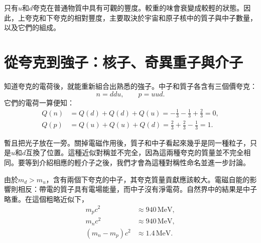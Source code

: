 \begin{classroomqa}
\end{classroomqa}

只有\(u\)和\(d\)夸克在普通物質中具有可觀的豐度。較重的味會衰變成較輕的狀態。因此，上夸克和下夸克的相對豐度，主要取決於宇宙和原子核中的質子與中子數量，以及它們的組成。

\begin{classroomqa}
\end{classroomqa}

\section{從夸克到強子：核子、奇異重子與介子}

知道夸克的電荷後，就能重新組合出熟悉的強子。中子和質子各含有三個價夸克：
\begin{equation}
n=ddu,
\qquad
p=uud.
\end{equation}
它們的電荷一算便知：
\begin{align}
Q(n) &= Q(d)+Q(d)+Q(u)
= -\frac13-\frac13+\frac23
=0,\\
Q(p) &= Q(u)+Q(u)+Q(d)
= \frac23+\frac23-\frac13
=1.
\end{align}

暫且把光子放在一旁。關掉電磁作用後，質子和中子看起來幾乎是同一種粒子，只是\(u\)和\(d\)互換了位置。這種近似對稱並不完全，因為這兩種夸克的質量並不完全相同。要等到介紹相應的輕介子之後，我們才會為這種對稱性命名並進一步討論。

由於\(m_d>m_u\)，含有兩個下夸克的中子，其夸克質量貢獻應該較大。電磁自能的影響則相反：帶電的質子具有電場能量，而中子沒有淨電荷。自然界中的結果是中子略重。在這個粗略近似下，
\begin{align}
m_pc^2&\approx940\,\mathrm{MeV},\\
m_nc^2&\approx940\,\mathrm{MeV},\\
(m_n-m_p)c^2&\approx1.4\,\mathrm{MeV}.
\end{align}

